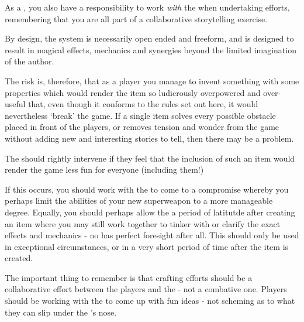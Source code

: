 As a , you also have a responsibility to work {\it with} the  when undertaking  efforts, remembering that you are all part of a collaborative storytelling exercise. 

By design, the  system is necessarily open ended and freeform, and is designed to result in magical effects, mechanics and synergies beyond the limited imagination of the author. 

The risk is, therefore, that as a player you manage to invent something with some properties which would render the item so ludicrously overpowered and over-useful that, even though it conforms to the rules set out here, it would nevertheless `break' the game. If a single item solves every possible obstacle placed in front of the players, or removes tension and wonder from the game without adding new and interesting stories to tell, then there may be a problem.

The  should rightly intervene if they feel that the inclusion of such an item would render the game less fun for everyone (including them!)

If this occurs, you should work with the  to come to a compromise whereby you perhaps limit the abilities of your new superweapon to a more manageable degree. Equally, you should perhaps allow the  a period of latitutde after creating an item where you may still work together to tinker with or clarify the exact effects and mechanics - no  has perfect foresight after all. This should only be used in exceptional circumstances, or in a very short period of time after the item is created. 

The important thing to remember is that crafting efforts should be a collaborative effort between the players and the  - not a combative one. Players should be working with the  to come up with fun ideas - not scheming as to what they can slip under the 's nose.
